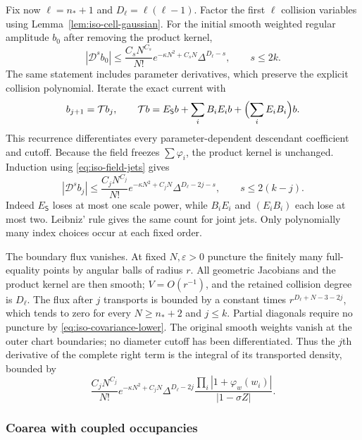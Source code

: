 \documentclass[11pt]{article}
\numberwithin{equation}{section}
\theoremstyle{definition}
\newcommand{\eps}{\varepsilon}
\begin{document}
Fix now $\ell=n_*+1$ and $D_\ell=\ell(\ell-1)$.
Factor the first $\ell$ collision variables using
Lemma~\ref{lem:iso-cell-gaussian}.  For the initial smooth weighted
regular amplitude $b_0$ after removing the product kernel,
\[
 |\mathcal D^s b_0|
 \le\frac{C_sN^{C_s}}{N!}e^{-\kappa N^2+C_sN}
                     \Delta^{D_\ell-s},\qquad s\le2k.
\]
The same statement includes parameter derivatives, which preserve the
explicit collision polynomial.  Iterate the exact current with
\begin{equation}\label{eq:iso-transport-recurrence}
 b_{j+1}=\mathcal T b_j,\qquad
 \mathcal T b=E_{\mathsf S}b+\sum_iB_iE_i b
                              +\Bigl(\sum_iE_iB_i\Bigr)b.
\end{equation}
This recurrence differentiates every parameter-dependent descendant
coefficient and cutoff.  Because the field freezes $\sum\varphi_i$,
the product kernel is unchanged.  Induction using
\eqref{eq:iso-field-jets} gives
\begin{equation}\label{eq:iso-transported-amplitude}
 |\mathcal D^s b_j|
 \le\frac{C_jN^{C_j}}{N!}e^{-\kappa N^2+C_jN}
              \Delta^{D_\ell-2j-s},\qquad s\le2(k-j).
\end{equation}
Indeed $E_{\mathsf S}$ loses at most one scale power, while
$B_iE_i$ and $(E_iB_i)$ each lose at most two.  Leibniz' rule gives
the same count for joint jets.  Only polynomially many index choices
occur at each fixed order.

The boundary flux vanishes.  At fixed $N,\eps>0$ puncture
the finitely many full-equality points by angular balls of radius
$r$.  All geometric Jacobians and the product kernel are then smooth;
$V=O(r^{-1})$, and the retained collision degree is $D_\ell$.
The flux after $j$ transports is bounded by a constant times
$r^{D_\ell+N-3-2j}$, which tends to zero for every $N\ge n_*+2$
and $j\le k$.  Partial diagonals require no puncture by
\eqref{eq:iso-covariance-lower}.  The original smooth weights vanish
at the outer chart boundaries; no diameter cutoff has been
differentiated.  Thus the $j$th derivative of the complete right term
is the integral of its transported density, bounded by
\begin{equation}\label{eq:iso-transported-density}
 \frac{C_jN^{C_j}}{N!}e^{-\kappa N^2+C_jN}
 \Delta^{D_\ell-2j}
 \frac{\prod_i|1+\varphi_w(w_i)|}{|1-\sigma Z|}.
\end{equation}

\subsubsection{Coarea with coupled occupancies}
\end{document}
